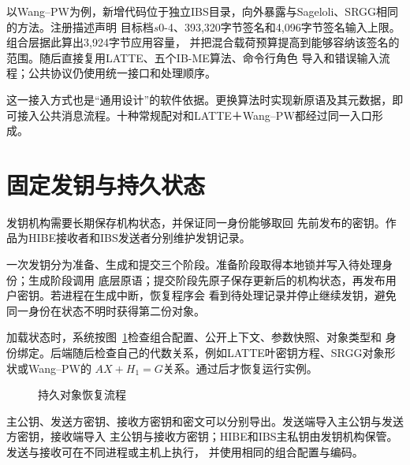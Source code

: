以Wang--PW为例，新增代码位于独立IBS目录，向外暴露与Sageloli、SRGG相同的方法。注册描述声明
目标档$s0$-4、393,320字节签名和4,096字节签名输入上限。组合层据此算出3,924字节应用容量，
并把混合载荷预算提高到能够容纳该签名的范围。随后直接复用LATTE、五个IB-ME算法、命令行角色
导入和错误输入流程；公共协议仍使用统一接口和处理顺序。

这一接入方式也是“通用设计”的软件依据。更换算法时实现新原语及其元数据，即可接入公共消息流程。十种常规配对和LATTE＋Wang--PW都经过同一入口形成。

\section{固定发钥与持久状态}

发钥机构需要长期保存机构状态，并保证同一身份能够取回
先前发布的密钥。作品为HIBE接收者和IBS发送者分别维护发钥记录。

一次发钥分为准备、生成和提交三个阶段。准备阶段取得本地锁并写入待处理身份；生成阶段调用
底层原语；提交阶段先原子保存更新后的机构状态，再发布用户密钥。若进程在生成中断，恢复程序会
看到待处理记录并停止继续发钥，避免同一身份在状态不明时获得第二份对象。

加载状态时，系统按图~\ref{fig:state-recovery}检查组合配置、公开上下文、参数快照、对象类型和
身份绑定。后端随后检查自己的代数关系，例如LATTE叶密钥方程、SRGG对象形状或Wang--PW的
$AX+H_1=G$关系。通过后才恢复运行实例。

\begin{figure}[H]
\centering
{}
\caption{持久对象恢复流程}
\label{fig:state-recovery}
\end{figure}

主公钥、发送方密钥、接收方密钥和密文可以分别导出。发送端导入主公钥与发送方密钥，接收端导入
主公钥与接收方密钥；HIBE和IBS主私钥由发钥机构保管。发送与接收可在不同进程或主机上执行，
并使用相同的组合配置与编码。

